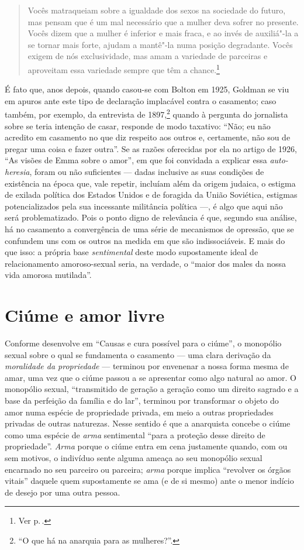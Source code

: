 \begin{quote}
Vocês matraqueiam sobre a igualdade dos sexos na sociedade do futuro, mas
pensam que é um mal necessário que a mulher deva sofrer no presente.
Vocês dizem que a mulher é inferior e mais fraca, e ao invés de
auxiliá"-la a se tornar mais forte, ajudam a mantê"-la numa posição
degradante. Vocês exigem de nós exclusividade, mas amam a variedade de
parceiras e aproveitam essa variedade sempre que têm a chance.\footnote{Ver p.\,\pageref{matraqueiam}.}
\end{quote}

É fato que, anos depois, quando casou-se com Bolton em 1925, Goldman
se viu em apuros ante este tipo de declaração implacável contra o
casamento; caso também, por exemplo, da entrevista de 1897,\footnote{``O que há
na anarquia para as mulheres?''.} quando à pergunta do jornalista sobre
se teria intenção de casar, responde de modo taxativo: ``Não; eu não
acredito em casamento no que diz respeito aos outros e, certamente, não
sou de pregar uma coisa e fazer outra''. Se as razões oferecidas por
ela no artigo de 1926, ``As visões de Emma sobre o amor'',
em que foi convidada a explicar essa \textit{auto-heresia}, foram ou não
suficientes --- dadas inclusive as suas condições de existência na época
que, vale repetir, incluíam além da origem judaica, o estigma de exilada
política dos Estados Unidos e de foragida da União Soviética,
estigmas potencializados pela sua incessante militância política ---, é
algo que aqui não será problematizado. Pois o ponto
digno de relevância é que, segundo sua análise, há no
casamento a convergência de uma série de mecanismos de opressão, que se
confundem uns com os outros na medida em que são indissociáveis. E mais
do que isso: a própria base \textit{sentimental} deste modo supostamente
ideal de relacionamento amoroso-sexual seria, na verdade, o ``maior dos
males da nossa vida amorosa mutilada''.

\section{Ciúme e amor livre}

Conforme desenvolve em ``Causas e cura possível para o ciúme'', o
monopólio sexual sobre o qual se fundamenta o casamento --- uma clara
derivação da \textit{moralidade da propriedade} --- terminou por envenenar a
nossa forma mesma de amar, uma vez que o ciúme passou a se apresentar
como algo natural ao amor. O monopólio sexual, ``transmitido de
geração a geração como um direito sagrado e a base da perfeição da
família e do lar'', terminou por transformar o objeto do amor numa
espécie de propriedade privada, em meio a outras propriedades privadas
de outras naturezas. Nesse sentido é que a anarquista concebe o
ciúme como uma espécie de \textit{arma} sentimental ``para a proteção desse
direito de propriedade''.
\textit{Arma} porque o ciúme entra em cena
justamente quando, com ou sem motivos, o indivíduo sente alguma ameaça
ao seu monopólio sexual encarnado no seu parceiro ou parceira; \textit{arma}
porque implica ``revolver os órgãos vitais'' daquele quem supostamente
se ama (e de si mesmo) ante o menor indício de desejo por uma outra
pessoa.

